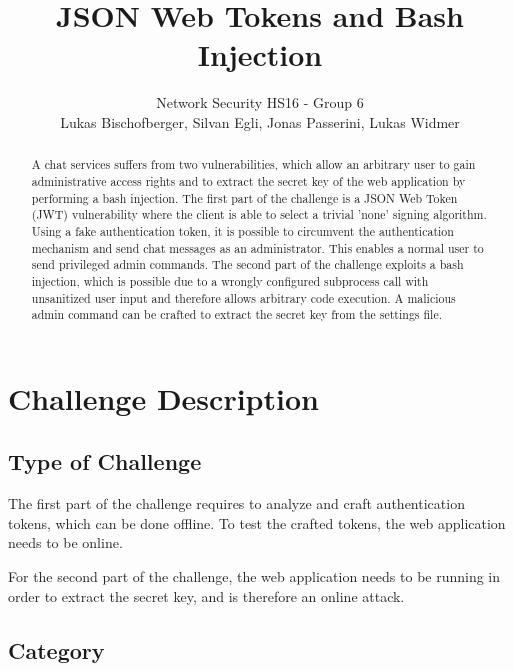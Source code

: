 \documentclass[12pt,a4paper]{article}
\title{JSON Web Tokens and Bash Injection}
\author{Network Security HS16 - Group 6\\Lukas Bischofberger, Silvan Egli, Jonas Passerini, Lukas Widmer}
\begin{document}
\maketitle

\begin{abstract}

A chat services suffers from two vulnerabilities, which allow an arbitrary user to gain administrative access rights and to extract the secret key of the web application by performing a bash injection.
The first part of the challenge is a JSON Web Token (JWT) vulnerability where the client is able to select a trivial 'none' signing algorithm. Using a fake authentication token, it is possible to circumvent the authentication mechanism and send chat messages as an administrator. This enables a normal user to send privileged admin commands.
The second part of the challenge exploits a bash injection, which is possible due to a wrongly configured subprocess call with unsanitized user input and therefore allows arbitrary code execution. A malicious admin command can be crafted to extract the secret key from the settings file.

\end{abstract}

\section{Challenge Description}

\subsection{Type of Challenge}

The first part of the challenge requires to analyze and craft authentication tokens, which can be done offline. To test the crafted tokens, the web application needs to be online.

For the second part of the challenge, the web application needs to be running in order to extract the secret key, and is therefore an online attack.

\subsection{Category}
\end{document}
